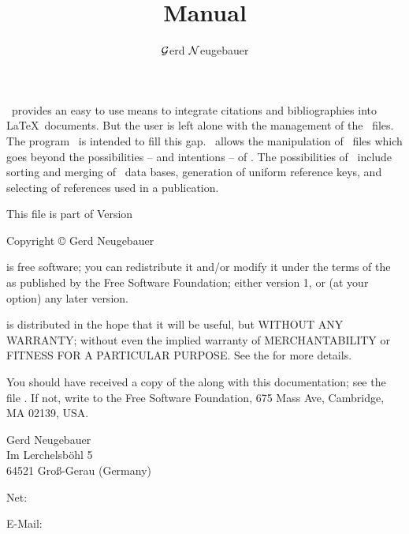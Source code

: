 \documentclass[11pt,a4paper]{scrbook}
\begin{document}

\title{\BibTool{} Manual}
\author{\(\cal G\)\hspace{-.1em}erd \(\cal N\)\hspace{-.2em}eugebauer}
\maketitle

\begin{Abstract}
  \BibTeX\ provides an easy to use means to integrate citations and
  bibliographies into \LaTeX\ documents. But the user is left alone with the
  management of the \BibTeX\ files. The program \BibTool\ is intended to fill
  this gap. \BibTool\ allows the manipulation of \BibTeX\ files which goes
  beyond the possibilities -- and intentions -- of \BibTeX. The possibilities
  of \BibTool\ include sorting and merging of \BibTeX\ data bases, generation
  of uniform reference keys, and selecting of references used in a
  publication.
\end{Abstract}

\newpage
\begingroup\setlength\parskip{1ex}\setlength\parindent{0pt}
This file is part of \BibTool{} Version \Version
\medskip\par

Copyright \copyright{} \Year{} Gerd Neugebauer
\medskip\par

\BibTool{} is free software; you can redistribute it and/or modify it under
the terms of the  as published by
the Free Software Foundation; either version 1, or (at your option) any later
version.

\BibTool{} is distributed in the hope that it will be useful, but WITHOUT ANY
WARRANTY; without even the implied warranty of MERCHANTABILITY or FITNESS FOR
A PARTICULAR PURPOSE.  See the  for
more details.

You should have received a copy of the  along with this documentation; see the file
.  If not, write to the Free Software Foundation, 675
Mass Ave, Cambridge, MA 02139, USA.
\vfill\par
Gerd Neugebauer\\
Im Lerchelsb\"ohl 5\\
64521 Gro\ss-Gerau (Germany)\par\noindent
Net: 
\par\noindent
E-Mail: 
\endgroup
\tableofcontents
\end{document}
